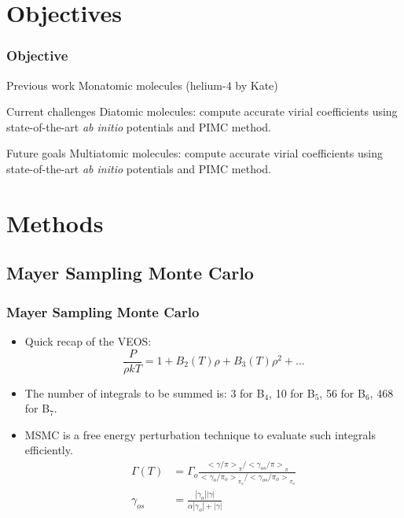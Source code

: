 \documentclass[xcolor=svgnames]{beamer}
\DeclareRobustCommand{\abinitio}[0]{\emph{ab initio}}
\begin{document}
    \section{Objectives}
        \begin{frame}
            \frametitle{Objective}
            \begin{block}{Previous work}
                Monatomic molecules (helium-4 by Kate)
            \end{block}
            \begin{block}{Current challenges}
                \alert<2->{Diatomic molecules: compute accurate virial coefficients using state-of-the-art \abinitio{} potentials and PIMC method.}
            \end{block}
            \begin{block}{Future goals}
                Multiatomic molecules: compute accurate virial coefficients using state-of-the-art \abinitio{} potentials and PIMC method.
            \end{block}
        \end{frame}
	\section{Methods}
	\subsection{Mayer Sampling Monte Carlo}
        \begin{frame}
            \frametitle{Mayer Sampling Monte Carlo}
            \begin{itemize}
            \justifying
                \item Quick recap of the VEOS:
                \begin{equation*}
                    \frac{P}{\rho kT} = 1 + B_2(T) \rho + B_3(T) \rho^2 + \ldots
                \end{equation*}
                \item The number of integrals to be summed is: 3 for B$_4$, 10 for B$_5$, 56 for B$_6$, 468 for B$_7$.
                \item MSMC is a free energy perturbation technique to evaluate such integrals efficiently.
                \begin{equation*}
                    \label{eq:MSMCworking}
                    \begin{aligned}
                        \Gamma (T) &= \Gamma_o \frac{{<\gamma/\pi>}_\pi / {<\gamma_{os}/\pi>}_\pi}{{<\gamma_o/\pi_o>}_{\pi_o} / {<\gamma_{os}/\pi_o>}_{\pi_o}}\\
                        \gamma_{os} &= \frac{|\gamma_o||\gamma|}{\alpha |\gamma_o| + |\gamma|}
                    \end{aligned}
                \end{equation*}
            \end{itemize}
        \end{frame}
\end{document}
